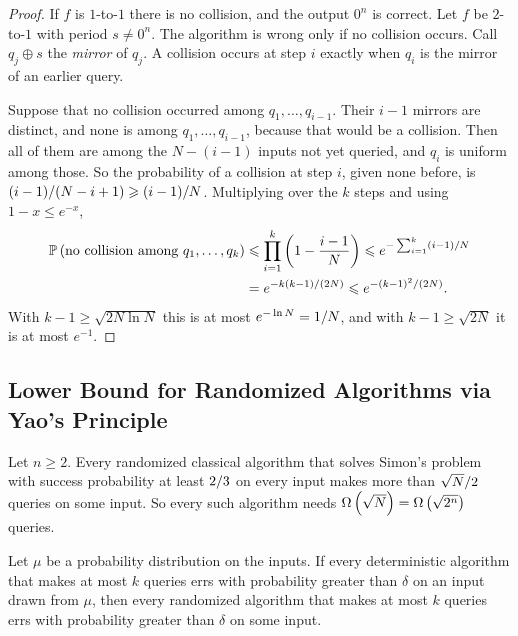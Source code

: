 \begin{proof}
    If $f$ is $1$-to-$1$ there is no collision, and the output $0^n$ is correct. Let $f$ be $2$-to-$1$
    with period $s \neq 0^n$. The algorithm is wrong only if no collision occurs. Call $q_j \oplus s$
    the \emph{mirror} of $q_j$. A collision occurs at step $i$ exactly when $q_i$ is the mirror of an
    earlier query.

    Suppose that no collision occurred among $q_1, \dots, q_{i-1}$. Their $i - 1$ mirrors are distinct,
    and none is among $q_1, \dots, q_{i-1}$, because that would be a collision. Then all of them are
    among the $N - (i-1)$ inputs not yet queried, and $q_i$ is uniform among those. So the
    probability of a collision at step $i$, given none before, is
    $(i-1)/(N-i+1) \geqslant (i-1)/N$. Multiplying over the $k$ steps and using
    $1 - x \leq e^{-x}$,
    \begin{align*}
        \operatorname{\mathbb{P}}\left(\text{no collision among } q_1, \dots, q_k\right)
         & \leqslant \prod_{i=1}^{k} \left(1 - \frac{i-1}{N}\right)
        \leqslant e^{-\sum_{i=1}^{k} (i-1)/N} \\
         & = e^{-k(k-1)/(2N)} \leqslant e^{-(k-1)^2/(2N)}.
    \end{align*}
    With $k - 1 \geq \sqrt{2N \ln N}$ this is at most $e^{-\ln N} = 1/N$, and with
    $k - 1 \geq \sqrt{2N}$ it is at most $e^{-1}$.
\end{proof}

\subsection{Lower Bound for Randomized Algorithms via Yao's Principle}

\begin{theorem}\label{thm:simon-rand-lb-1001}
    Let $n \geq 2$. Every randomized classical algorithm that solves Simon's problem with success
    probability at least $2/3$ on every input makes more than $\sqrt{N}/2$ queries on
    some input. So every such algorithm needs $\Omega\left(\sqrt{N}\right) = \Omega\left(\sqrt{2^n}\right)$ queries.
\end{theorem}

\begin{lemma}\label{lem:yao-1001}
    Let $\mu$ be a probability distribution on the inputs. If every deterministic algorithm that makes at
    most $k$ queries errs with probability greater than $\delta$ on an input drawn from $\mu$, then every
    randomized algorithm that makes at most $k$ queries errs with probability greater than $\delta$ on
    some input.
\end{lemma}


